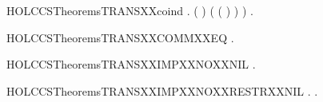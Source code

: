 \begin{SaveVerbatim}{HOLCCSTheoremsTRANSXXcoind}
            \HOLSymConst{\HOLTokenExists{}} .
                ( \HOLSymConst{=}   ) \HOLSymConst{\HOLTokenConj{}}
                 (  (  ) )  ) \HOLSymConst{\HOLTokenImp{}}
       \HOLSymConst{\HOLTokenForall{}}  .     \HOLSymConst{\HOLTokenImp{}}  \HOLTokenTransBegin{}\HOLTokenTransEnd {}
\end{SaveVerbatim}
\newcommand{\HOLCCSTheoremsTRANSXXcoind}{\UseVerbatim{HOLCCSTheoremsTRANSXXcoind}}
\begin{SaveVerbatim}{HOLCCSTheoremsTRANSXXCOMMXXEQ}
\HOLTokenTurnstile{} \HOLSymConst{\HOLTokenForall{}}   .  \HOLSymConst{+}  \HOLTokenTransBegin{}\HOLTokenTransEnd {} \HOLSymConst{\HOLTokenEquiv{}}  \HOLSymConst{+}  \HOLTokenTransBegin{}\HOLTokenTransEnd {}
\end{SaveVerbatim}
\newcommand{\HOLCCSTheoremsTRANSXXCOMMXXEQ}{\UseVerbatim{HOLCCSTheoremsTRANSXXCOMMXXEQ}}
\begin{SaveVerbatim}{HOLCCSTheoremsTRANSXXIMPXXNOXXNIL}
\HOLTokenTurnstile{} \HOLSymConst{\HOLTokenForall{}}  .  \HOLTokenTransBegin{}\HOLTokenTransEnd {} \HOLSymConst{\HOLTokenImp{}}  \HOLSymConst{\HOLTokenNotEqual{}} 
\end{SaveVerbatim}
\newcommand{\HOLCCSTheoremsTRANSXXIMPXXNOXXNIL}{\UseVerbatim{HOLCCSTheoremsTRANSXXIMPXXNOXXNIL}}
\begin{SaveVerbatim}{HOLCCSTheoremsTRANSXXIMPXXNOXXRESTRXXNIL}
\HOLTokenTurnstile{} \HOLSymConst{\HOLTokenForall{}}  .  \HOLTokenTransBegin{}\HOLTokenTransEnd {} \HOLSymConst{\HOLTokenImp{}} \HOLSymConst{\HOLTokenForall{}}.  \HOLSymConst{\HOLTokenNotEqual{}} \HOLConst{\ensuremath{\nu}}  
\end{SaveVerbatim}
